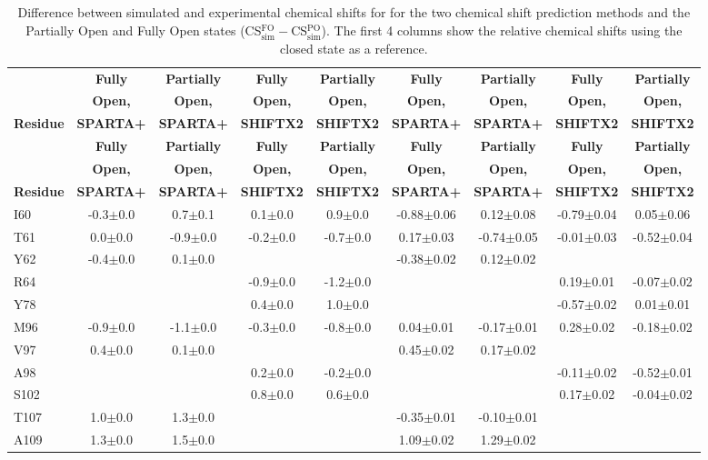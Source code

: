 \documentclass[%
 aip,
 amsmath,amssymb,
 preprint,%
]{revtex4-1}
\newcommand{\cb}{\ce{C_\beta} }
\begin{document}
\begingroup
\begin{center}
\begin{longtable}{l|c|c|c|c|c|c|c|c}
\caption{\scriptsize Difference between simulated and experimental chemical shifts for \cb for the two chemical shift prediction methods and the Partially Open and Fully Open states (CS$_\text{sim}^\text{FO}-$CS$_\text{sim}^\text{PO}$). The first 4 columns show the relative chemical shifts using the closed state as a reference.  \label{SI_tb_DDCS_CB}}\\ 
\hline 
\hline 
& \textbf{Fully} & \textbf{Partially} & \textbf{Fully} & \textbf{Partially} & \textbf{Fully} & \textbf{Partially} & \textbf{Fully} & \textbf{Partially} \\
& \textbf{Open,} & \textbf{Open,} & \textbf{Open,} & \textbf{Open,} & \textbf{Open,} & \textbf{Open,} & \textbf{Open,} & \textbf{Open,} \\
\textbf{Residue} & \textbf{SPARTA+} & \textbf{SPARTA+} & \textbf{SHIFTX2} & \textbf{SHIFTX2} & \textbf{SPARTA+} & \textbf{SPARTA+} & \textbf{SHIFTX2} & \textbf{SHIFTX2} \\
\hline
\endfirsthead 
\hline
& \textbf{Fully} & \textbf{Partially} & \textbf{Fully} & \textbf{Partially} & \textbf{Fully} & \textbf{Partially} & \textbf{Fully} & \textbf{Partially} \\
& \textbf{Open,} & \textbf{Open,} & \textbf{Open,} & \textbf{Open,} & \textbf{Open,} & \textbf{Open,} & \textbf{Open,} & \textbf{Open,} \\
\textbf{Residue} & \textbf{SPARTA+} & \textbf{SPARTA+} & \textbf{SHIFTX2} & \textbf{SHIFTX2} & \textbf{SPARTA+} & \textbf{SPARTA+} & \textbf{SHIFTX2} & \textbf{SHIFTX2} \\ \hline
\endhead
I60 & -0.3$\pm$0.0 & 0.7$\pm$0.1 & 0.1$\pm$0.0 & 0.9$\pm$0.0 & -0.88$\pm$0.06 & 0.12$\pm$0.08 & -0.79$\pm$0.04 & 0.05$\pm$0.06 \\
T61 & 0.0$\pm$0.0 & -0.9$\pm$0.0 & -0.2$\pm$0.0 & -0.7$\pm$0.0 & 0.17$\pm$0.03 & -0.74$\pm$0.05 & -0.01$\pm$0.03 & -0.52$\pm$0.04 \\
Y62 & -0.4$\pm$0.0 & 0.1$\pm$0.0 & & & -0.38$\pm$0.02 & 0.12$\pm$0.02 & & \\
R64 & & & -0.9$\pm$0.0 & -1.2$\pm$0.0 & & & 0.19$\pm$0.01 & -0.07$\pm$0.02 \\
Y78 & & & 0.4$\pm$0.0 & 1.0$\pm$0.0 & & & -0.57$\pm$0.02 & 0.01$\pm$0.01 \\
M96 & -0.9$\pm$0.0 & -1.1$\pm$0.0 & -0.3$\pm$0.0 & -0.8$\pm$0.0 & 0.04$\pm$0.01 & -0.17$\pm$0.01 & 0.28$\pm$0.02 & -0.18$\pm$0.02 \\
V97 & 0.4$\pm$0.0 & 0.1$\pm$0.0 & & & 0.45$\pm$0.02 & 0.17$\pm$0.02 & & \\
A98 & & & 0.2$\pm$0.0 & -0.2$\pm$0.0 & & & -0.11$\pm$0.02 & -0.52$\pm$0.01 \\
S102 & & & 0.8$\pm$0.0 & 0.6$\pm$0.0 & & & 0.17$\pm$0.02 & -0.04$\pm$0.02 \\
T107 & 1.0$\pm$0.0 & 1.3$\pm$0.0 & & & -0.35$\pm$0.01 & -0.10$\pm$0.01 & & \\
A109 & 1.3$\pm$0.0 & 1.5$\pm$0.0 & & & 1.09$\pm$0.02 & 1.29$\pm$0.02 & & \\
\end{longtable}
\end{center}
\endgroup
\end{document}
